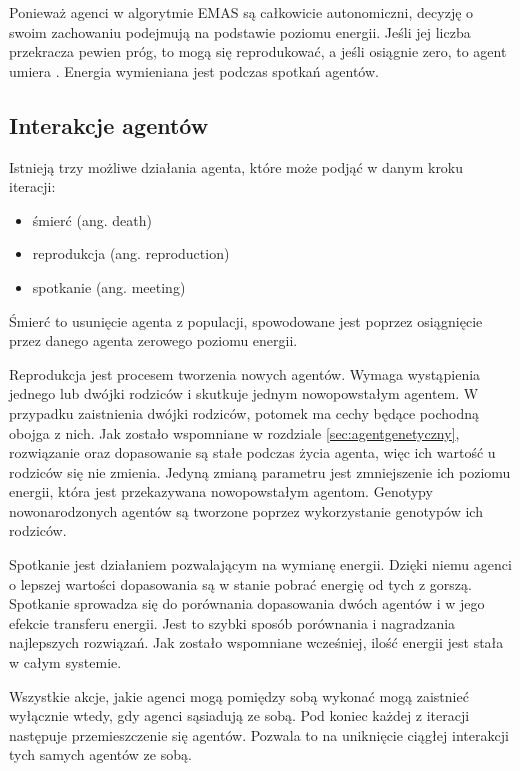 Ponieważ agenci w algorytmie EMAS są całkowicie autonomiczni, decyzję o swoim zachowaniu podejmują na podstawie poziomu energii. Jeśli jej liczba przekracza pewien próg, to mogą się reprodukować, a jeśli osiągnie zero, to agent umiera \cite{emas3}. Energia wymieniana jest podczas spotkań agentów.


\subsection{Interakcje agentów}
Istnieją trzy możliwe działania agenta, które może podjąć w danym kroku iteracji:
\begin{itemize} 
\item śmierć (ang. death) 
\item reprodukcja (ang. reproduction) 
\item spotkanie (ang. meeting) 
\end{itemize}

Śmierć to usunięcie agenta z populacji, spowodowane jest poprzez osiągnięcie przez danego agenta zerowego poziomu energii.

Reprodukcja jest procesem tworzenia nowych agentów. Wymaga wystąpienia jednego lub dwójki rodziców i skutkuje jednym nowopowstałym agentem. W przypadku zaistnienia dwójki rodziców, potomek ma cechy będące pochodną obojga z nich. Jak zostało wspomniane w rozdziale \ref{sec:agentgenetyczny}, rozwiązanie oraz dopasowanie są stałe podczas życia agenta, więc ich wartość u rodziców się nie zmienia. Jedyną zmianą parametru jest zmniejszenie ich poziomu energii, która jest przekazywana nowopowstałym agentom. Genotypy nowonarodzonych agentów są tworzone poprzez wykorzystanie genotypów ich rodziców.

Spotkanie jest działaniem pozwalającym na wymianę energii. Dzięki niemu agenci o lepszej wartości dopasowania są w stanie pobrać energię od tych z gorszą. Spotkanie sprowadza się do porównania dopasowania dwóch agentów i w jego efekcie transferu energii. Jest to szybki sposób porównania i nagradzania najlepszych rozwiązań. Jak zostało wspomniane wcześniej, ilość energii jest stała w całym systemie.

Wszystkie akcje, jakie agenci mogą pomiędzy sobą wykonać mogą zaistnieć wyłącznie wtedy, gdy agenci sąsiadują ze sobą. Pod koniec każdej z iteracji następuje przemieszczenie się agentów. Pozwala to na uniknięcie ciągłej interakcji tych samych agentów ze sobą.

